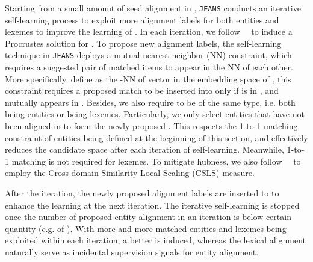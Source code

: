 \documentclass[11pt,a4paper]{article}
\newcommand{\modelname}[0]{\texttt{JEANS}\xspace}
\begin{document}
Starting from a small amount of seed alignment in , \modelname conducts an iterative self-learning process to exploit more alignment labels for both entities and lexemes to improve the learning of .
In each iteration, we follow~\citeauthor{conneau2018word}~ to induce a Procrustes solution for .
To propose new alignment labels, the self-learning technique in \modelname deploys a mutual nearest neighbor (NN) constraint, which requires a suggested pair of matched items to appear in the NN of each other.
More specifically, define  as the -NN of vector  in the embedding space of , this constraint requires a proposed match  to be inserted into  only if  is in , and  mutually appears in .
Besides, we also require  to be of the same type, i.e. both being entities or being lexemes.
Particularly, we only select entities that have not been aligned in  to form the newly-proposed .
This respects the 1-to-1 matching constraint of entities being defined at the beginning of this section, and effectively reduces the candidate space after each iteration of self-learning.
Meanwhile, 1-to-1 matching is not required for lexemes.
To mitigate hubness, 
we also follow~\citeauthor{conneau2018word}~ to employ the Cross-domain Similarity Local Scaling (CSLS) measure.


After the iteration, the newly proposed alignment labels are inserted to  to enhance the learning at the next iteration.
The iterative self-learning is stopped once the number of proposed entity alignment in an iteration is below certain quantity (e.g.  of ).
With more and more matched entities and lexemes being exploited within each iteration,
a better  is induced, whereas the lexical alignment naturally serve as incidental supervision signals for entity alignment.
\end{document}
